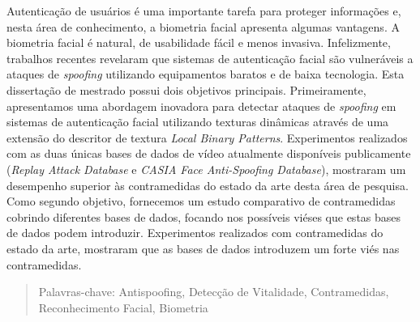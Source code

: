 Autentica\c{c}\~ao de usu\'{a}rios \'{e} uma importante tarefa para proteger informa\c{c}\~{o}es e, nesta \'area de conhecimento, a biometria facial apresenta algumas vantagens. A biometria facial \'{e} natural, de usabilidade f\'{a}cil e menos invasiva. Infelizmente, trabalhos recentes revelaram que sistemas de autentica\c{c}\~{a}o facial s\~{a}o vulner\'{a}veis a ataques de \textit{spoofing} utilizando equipamentos baratos e de baixa tecnologia. Esta disserta\c{c}\~{a}o de mestrado possui dois objetivos principais. Primeiramente, apresentamos uma abordagem inovadora para detectar ataques de \textit{spoofing} em sistemas de autentica\c{c}\~{a}o facial utilizando texturas din\^{a}micas atrav\'{e}s de uma extens\~{a}o do descritor de textura \textit{Local Binary Patterns}. Experimentos realizados com as duas \'{u}nicas bases de dados de v\'{i}deo atualmente dispon\'{i}veis publicamente (\textit{Replay Attack Database} e \textit{CASIA Face Anti-Spoofing Database}), mostraram um desempenho superior \`{a}s contramedidas do estado da arte desta \'{a}rea de pesquisa. Como segundo objetivo, fornecemos um estudo comparativo de contramedidas cobrindo diferentes bases de dados, focando nos poss\'{i}veis vi\'{e}ses que estas bases de dados podem introduzir. Experimentos realizados com contramedidas do estado da arte, mostraram que as bases de dados introduzem um forte vi\'{e}s nas contramedidas.


\begin{quotation}
\noindent 

\vspace*{0.5cm}

\noindent Palavras-chave: Antispoofing, Detec\c{c}\~{a}o de Vitalidade, Contramedidas, Reconhecimento Facial, Biometria
\end{quotation}


\newpage
\null
